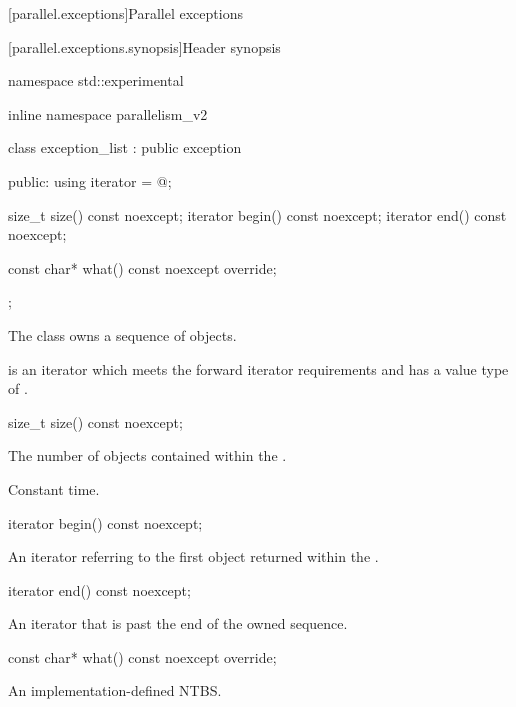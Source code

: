 
[parallel.exceptions]{Parallel exceptions}

[parallel.exceptions.synopsis]{Header  synopsis}

\begin{codeblock}
namespace std::experimental {
inline namespace parallelism_v2 {

  class exception_list : public exception {
  public:
    using iterator = @\unspec@;

    size_t size() const noexcept;
    iterator begin() const noexcept;
    iterator end() const noexcept;

    const char* what() const noexcept override;
  };
}
}
\end{codeblock}

\pnum
The class  owns a sequence of  objects.

\pnum
{} is an iterator which meets the forward iterator requirements and has a value type of .

\begin{itemdecl}
size_t size() const noexcept;
\end{itemdecl}

\begin{itemdescr}
  \pnum
  \returns The number of  objects contained within the .

  \pnum
  \complexity Constant time.
\end{itemdescr}

\begin{itemdecl}
iterator begin() const noexcept;
\end{itemdecl}

\begin{itemdescr}
  \pnum
  \returns An iterator referring to the first  object returned within the .
\end{itemdescr}

\begin{itemdecl}
iterator end() const noexcept;
\end{itemdecl}

\begin{itemdescr}
  \pnum
  \returns An iterator that is past the end of the owned sequence.
\end{itemdescr}

\begin{itemdecl}
const char* what() const noexcept override;
\end{itemdecl}

\begin{itemdescr}
  \pnum
  \returns An implementation-defined NTBS.
\end{itemdescr}

